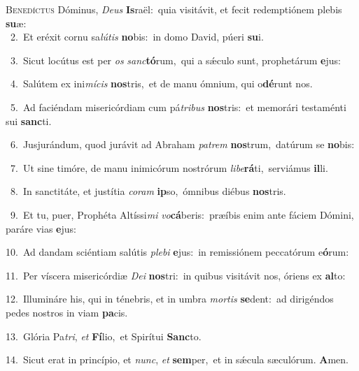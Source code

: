 \lettrine{\initial\textcolor{\initialcolor}{B}}{enedíctus} Dóminus, \textit{De}\-\textit{us} \textbf{Is}\-raël:~\star quia visitávit, et fecit redemptiónem plebis \textbf{su}\-æ:\\
{\numbfont\textcolor{\numbcolor}{~2.}}~Et eréxit cornu sa\-\textit{lú}\-\textit{tis} \textbf{no}\-bis:~\star in domo David, púeri \textbf{su}\-i.\par
{\numbfont\textcolor{\numbcolor}{~3.}}~Sicut locútus est per \textit{os} \textit{sanc}\-\textbf{tó}rum,~\star qui a sǽculo sunt, prophetárum \textbf{e}\-jus:\par
{\numbfont\textcolor{\numbcolor}{~4.}}~Salútem ex ini\-\textit{mí}\-\textit{cis} \textbf{nos}\-tris,~\star et de manu ómnium, qui o\-\textbf{dé}\-runt nos.\par
{\numbfont\textcolor{\numbcolor}{~5.}}~Ad faciéndam misericórdiam cum pá\-\textit{tri}\-\textit{bus} \textbf{nos}\-tris:~\star et memorári testaménti sui \textbf{sanc}\-ti.\par
{\numbfont\textcolor{\numbcolor}{~6.}}~Jusjurándum, quod jurávit ad Abraham \textit{pa}\-\textit{trem} \textbf{nos}\-trum,~\star datúrum se \textbf{no}\-bis:\par
{\numbfont\textcolor{\numbcolor}{~7.}}~Ut sine timóre, de manu inimicórum nostrórum \textit{li}\-\textit{be}\textbf{rá}ti,~\star serviámus \textbf{il}\-li.\par
{\numbfont\textcolor{\numbcolor}{~8.}}~In sanctitáte, et justítia \textit{co}\-\textit{ram} \textbf{ip}\-so,~\star ómnibus diébus \textbf{nos}\-tris.\par
{\numbfont\textcolor{\numbcolor}{~9.}}~Et tu, puer, Prophéta Altíssi\textit{mi} \textit{vo}\-\textbf{cá}beris:~\star præíbis enim ante fáciem Dómini, paráre vias \textbf{e}\-jus:\par
{\numbfont\textcolor{\numbcolor}{10.}}~Ad dandam sciéntiam salútis \textit{ple}\-\textit{bi} \textbf{e}\-jus:~\star in remissiónem peccatórum e\-\textbf{ó}\-rum:\par
{\numbfont\textcolor{\numbcolor}{11.}}~Per víscera misericórdiæ \textit{De}\-\textit{i} \textbf{nos}\-tri:~\star in quibus visitávit nos, óriens ex \textbf{al}\-to:\par
{\numbfont\textcolor{\numbcolor}{12.}}~Illumináre his, qui in ténebris, et in umbra \textit{mor}\-\textit{tis} \textbf{se}\-dent:~\star ad dirigéndos pedes nostros in viam \textbf{pa}\-cis.\par
{\numbfont\textcolor{\numbcolor}{13.}}~Glória Pa\-\textit{tri}\-, \textit{et} \textbf{Fí}\-lio,~\star et Spirítui \textbf{Sanc}\-to.\par
{\numbfont\textcolor{\numbcolor}{14.}}~Sicut erat in princípio, et \textit{nunc}\-, \textit{et} \textbf{sem}\-per,~\star et in sǽcula sæculórum. \textbf{A}\-men.\par
